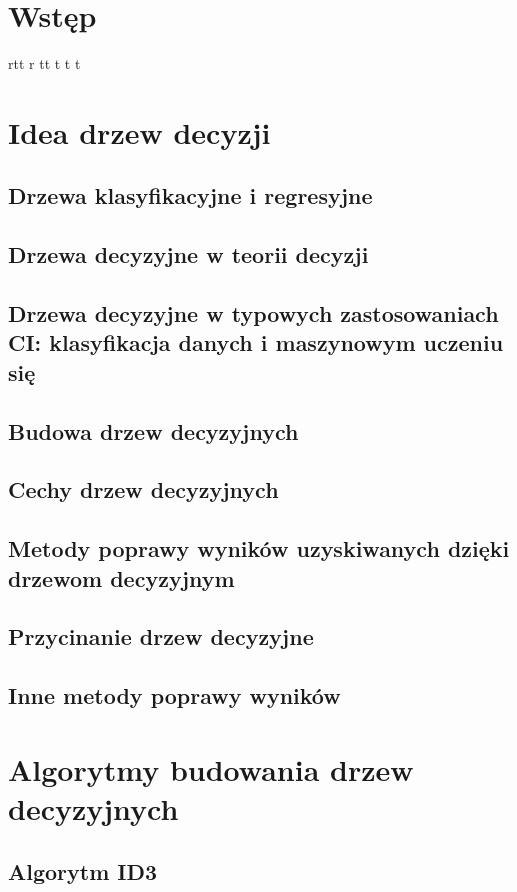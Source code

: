 \documentclass[10pt,a4paper]{article}
\begin{document}
\tableofcontents
\newpage

\section{Wstęp}
rtt r  tt\cite{test} t t t
\section{Idea drzew decyzji}
\subsection{Drzewa klasyfikacyjne i regresyjne}
\subsection{Drzewa decyzyjne w teorii decyzji}
\subsection{Drzewa decyzyjne w typowych zastosowaniach CI: klasyfikacja danych i maszynowym uczeniu się}
\subsection{Budowa drzew decyzyjnych}
\subsection{Cechy drzew decyzyjnych}
\subsection{Metody poprawy wyników uzyskiwanych dzięki drzewom decyzyjnym}
\subsection{Przycinanie drzew decyzyjne}
\subsection{Inne metody poprawy wyników}

\section{Algorytmy budowania drzew decyzyjnych}
\subsection{Algorytm ID3}
\end{document}
